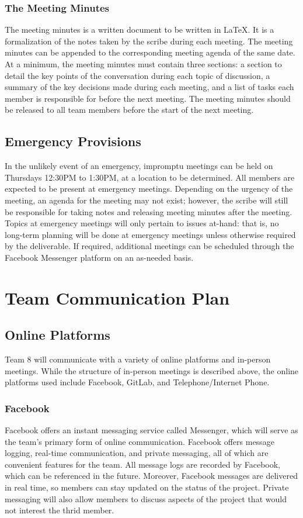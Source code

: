 \documentclass{article}
\begin{document}
\subsubsection{The Meeting Minutes}
The meeting minutes is a written document to be written in \LaTeX. It is a 
formalization of the notes taken by the scribe during each meeting. The meeting 
minutes can be appended to the corresponding meeting agenda of the same date. At 
a minimum, the meeting minutes must contain three sections: a section to detail 
the key points of the conversation during each topic of discussion, a summary of 
the key decisions made during each meeting, and a list of tasks each member is 
responsible for before the next meeting. The meeting minutes should be released 
to all team members before the start of the next meeting.

\subsection{Emergency Provisions}
In the unlikely event of an emergency, impromptu meetings can be held on 
Thursdays 12:30PM to 1:30PM, at a location to be determined. All members are 
expected to be present at emergency meetings. Depending on the urgency of the 
meeting, an agenda for the meeting may not exist; however, the scribe will still 
be responsible for taking notes and releasing meeting minutes after the meeting. 
Topics at emergency meetings will only pertain to issues at-hand: that is, no 
long-term planning will be done at emergency meetings unless otherwise required 
by the deliverable. If required, additional meetings can be scheduled through 
the Facebook Messenger platform on an as-needed basis.

\section{Team Communication Plan}
\subsection{Online Platforms}
Team 8 will communicate with a variety of online platforms and in-person 
meetings. While the structure of in-person meetings is described above, the online platforms used include Facebook, GitLab, and Telephone/Internet Phone.

\subsubsection{Facebook}
Facebook offers an instant messaging service called Messenger, which will serve as the team's primary form of online communication. Facebook offers message logging, real-time communication, and private messaging, all of which are convenient features for the team. All message logs are recorded by Facebook, which can be referenced in the future. Moreover, Facebook messages are delivered in real time, so members can stay updated on the status of the project. Private messaging will also allow members to discuss aspects of the project that would not interest the thrid member.
\end{document}
